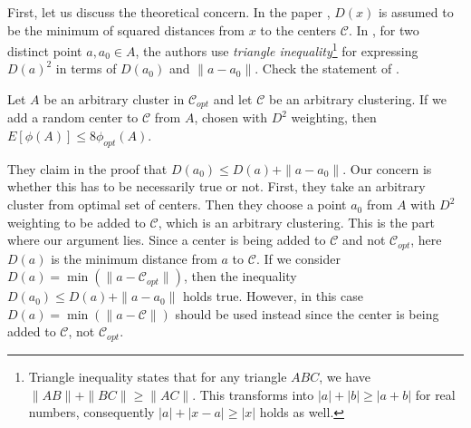 \documentclass[twoside, 11pt]{article}
\newcommand{\C}{\mathcal{C}}
\begin{document}
	First, let us discuss the theoretical concern. In the paper \cite{kmeans++}, $D(x)$ is assumed to be the minimum of squared distances  from $x$ to the centers $\C$. In \citep[Lemma $3.3$, section $3$]{kmeans++}, for two distinct point $a,a_0\in A$, the authors use \textit{triangle inequality}\footnote{Triangle inequality states that for any triangle $ABC$, we have $\|AB\|+\|BC\|\geq \|AC\|$. This transforms into $|a|+|b|\geq |a+b|$ for real numbers, consequently $|a|+|x-a|\geq |x|$ holds as well.} for expressing $D(a)^2$ in terms of $D(a_0)$ and $\|a-a_0\|$. Check the statement of \citet[Lemma $3.3$]{kmeans++}.
		\begin{lemma}
			Let $A$ be an arbitrary cluster in $\C_{opt}$ and let $\C$ be an arbitrary clustering. If we add a random center to $\C$ from $A$, chosen with $D^2$ weighting, then $E[\phi(A)] \leq 8\phi_{opt}(A)$.
		\end{lemma}
	They claim in the proof that $D(a_0)\leq D(a)+\|a-a_0\|$. Our concern is whether this has to be necessarily true or not. First, they take an arbitrary cluster from optimal set of centers. Then they choose a point $a_0$ from $A$ with $D^2$ weighting to be added to $\C$, which is an arbitrary clustering. This is the part where our argument lies. Since a center is being added to $\C$ and not $\C_{opt}$, here $D(a)$ is the minimum distance from $a$ to $\C$. If we consider $D(a)=\min(\|a-\C_{opt}\|)$, then the inequality $D(a_0)\leq D(a)+\|a-a_0\|$ holds true. However, in this case $D(a)=\min(\|a-\C\|)$ should be used instead since the center is being added to $\C$, not $\C_{opt}$.
	
\end{document}
